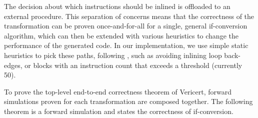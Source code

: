\noindent
The decision about which  instructions should be inlined is offloaded
to an external procedure.
This separation of concerns means that the correctness of the transformation can
be proven once-and-for-all for a single, general if-conversion algorithm, which
can then be extended with various heuristics to change the performance of the
generated code.  In our implementation, we use simple static heuristics to pick
these paths, following \textcite{ball93_branc_predic_free}, such as avoiding
inlining loop back-edges, or blocks with an instruction count that exceeds a
threshold (currently
50).

To prove the top-level end-to-end correctness theorem of Vericert, forward simulations proven for each transformation are composed together.  The following theorem is a forward simulation and states the correctness of if-conversion.

